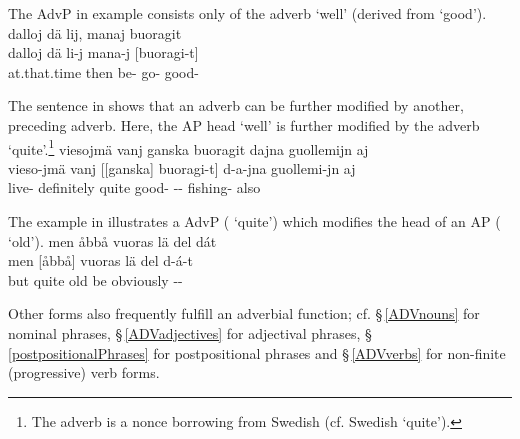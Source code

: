 The AdvP in example  consists only of the adverb  ‘well’ (derived from  ‘good’).
\ea\label{AdvPex1}
\glll	dalloj dä lij, manaj buoragit\\
	dalloj dä li-j mana-j {[buoragi-t]\subAdvP}\\
	at.that.time then be- go- good-\\\nopagebreak
{}	
\z

The sentence in  shows that an adverb can be further modified by another, preceding adverb. Here, the AP head  ‘well’ is further modified by the adverb  ‘quite’.\footnote{The adverb  is a nonce borrowing from Swedish (cf. Swedish  ‘quite’).}
\ea\label{derivedADVsEx2repeat}%
\glll	viesojmä vanj ganska buoragit dajna guollemijn aj\\
	vieso-jmä vanj {[[ganska]\subAdvP{}} {buoragi-t]\subAdvP{}} d-a-jna guollemi-jn aj\\
	live- definitely quite good- -- fishing- also\\\nopagebreak
{}	
\z

The example in  illustrates a AdvP ( ‘quite’) which modifies the head of an AP ( ‘old’).
\ea\label{AdvPex2}
\glll	men åbbå vuoras lä del dát\\
	men {[åbbå]\subAdvP} vuoras lä del d-á-t\\
	but quite old\BS{} be\BS{} obviously --\\\nopagebreak
{}	
\z

Other forms also frequently fulfill an adverbial function; cf. 
§\,\ref{ADVnouns} for nominal phrases, 
§\,\ref{ADVadjectives} for adjectival phrases, 
§\,\ref{postpositionalPhrases} for postpositional phrases 
and §\,\ref{ADVverbs} for non-finite (progressive) verb forms. 





